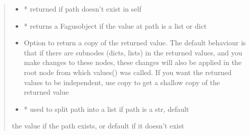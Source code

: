 \documentclass[a4paper,10pt,english]{sphinxmanual}
\begin{document}
\begin{fulllineitems}
\begin{fulllineitems}
\begin{quote}
\begin{description}
\begin{itemize}
\item {}
\sphinxAtStartPar
{} \textendash{} * returned if path doesn’t exist in self

\item {}
\sphinxAtStartPar
{} \textendash{} * returns a Fagus\sphinxhyphen{}object if the value at path is a list or dict

\item {}
\sphinxAtStartPar
{} \textendash{} Option to return a copy of the returned value. The default behaviour is that if there are subnodes
(dicts, lists) in the returned values, and you make changes to these nodes, these changes will also be
applied in the root node from which values() was called. If you want the returned values to be
independent, use copy to get a shallow copy of the returned value

\item {}
\sphinxAtStartPar
{} \textendash{} * used to split path into a list if path is a str, default 

\end{itemize}

\sphinxAtStartPar
the value if the path exists, or default if it doesn’t exist

\end{description}\end{quote}

\end{fulllineitems}



\end{fulllineitems}
\end{document}
